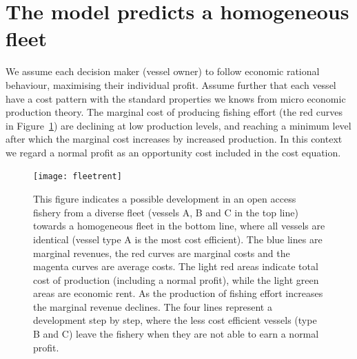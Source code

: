 \documentclass[11pt,fleqn]{book} %
\begin{document}
\section{The model predicts a homogeneous fleet}
We assume each decision maker (vessel owner) to follow economic rational behaviour, maximising their individual profit. Assume further that each vessel have a cost pattern with the standard properties we knows from micro economic production theory. The marginal cost of producing fishing effort (the red curves in Figure~\ref{fig:fleetrent}) are declining at low production levels, and reaching a minimum level after which the marginal cost increases by increased production. In this context we regard a normal profit as an opportunity cost included in the cost equation.
\begin{figure}[ht]
\centering
\texttt{[image: fleetrent]}
\caption{This figure indicates a possible development in an open access fishery from a diverse fleet (vessels A, B and C in the top line) towards a homogeneous fleet in the bottom line, where all vessels are identical (vessel type A is the most cost efficient). The blue lines are marginal revenues, the red curves are marginal costs and the magenta curves are average costs. The light red areas indicate total cost of production (including a normal profit), while the light green areas are economic rent. As the production of fishing effort increases the marginal revenue declines. The four lines represent a development step by step, where the less cost efficient vessels (type B and C) leave the fishery when they are not able to earn a normal profit.}
\label{fig:fleetrent}
\end{figure}
\end{document}
